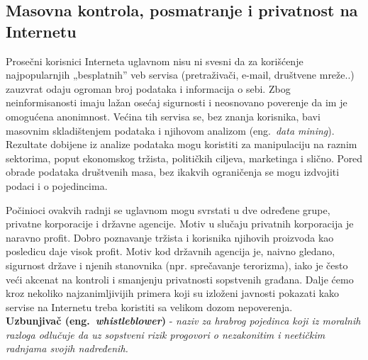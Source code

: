 \documentclass[a4paper]{article}
\begin{document}
\subsection{Masovna kontrola, posmatranje i privatnost na Internetu}
\label{subsec:podnaslovIP4}
\indent\indent Prosečni korisnici Interneta uglavnom nisu ni svesni da za korišćenje najpopularnjih „besplatnih” veb servisa (pretraživači, e-mail, društvene mreže..) zauzvrat odaju ogroman broj podataka i informacija o sebi. Zbog neinformisanosti imaju lažan osećaj sigurnosti i neosnovano poverenje da im je omogućena anonimnost. Većina tih servisa se, bez znanja korisnika, bavi masovnim skladištenjem podataka i njihovom analizom (eng.~{\em data mining}). Rezultate dobijene iz analize podataka mogu koristiti za manipulaciju na raznim sektorima, poput ekonomskog tržista, političkih ciljeva, marketinga i slično. Pored obrade podataka društvenih masa, bez ikakvih ograničenja se mogu izdvojiti podaci i o pojedincima.
		
	Počinioci ovakvih radnji se uglavnom mogu svrstati u dve određene grupe, privatne korporacije i državne agencije. Motiv u slučaju privatnih korporacija je naravno profit. Dobro poznavanje tržista i korisnika njihovih proizvoda kao posledicu daje visok profit. Motiv kod državnih agencija je, naivno gledano, sigurnost države i njenih stanovnika (npr. sprečavanje terorizma), iako je često veći akcenat na kontroli i smanjenju privatnosti sopstvenih građana. Dalje ćemo kroz nekoliko najzanimljivijih primera koji su izloženi javnosti pokazati kako servise na Internetu treba koristiti sa velikom dozom nepoverenja.\\
	
\textbf{Uzbunjivač (eng.~{\em whistleblower})} - \textit{naziv za hrabrog pojedinca koji iz moralnih razloga odlučuje da uz sopstveni rizik progovori o nezakonitim i neetičkim radnjama svojih nadređenih.}
\end{document}
